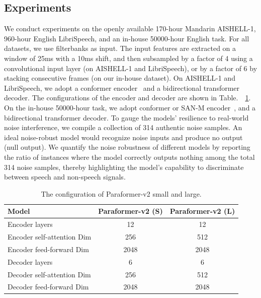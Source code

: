 \documentclass[runningheads]{llncs}
\begin{document}
\subsection{Experiments}
We conduct experiments on the openly available 170-hour Mandarin AISHELL-1, 960-hour English LibriSpeech, and an in-house 50000-hour English task. For all datasets, we use filterbanks as input. The input features are extracted on a window of 25ms with a 10ms shift, and then subsampled by a factor of 4 using a convolutional input layer (on AISHELL-1 and LibriSpeech), or by a factor of 6 by stacking consecutive frames (on our in-house dataset). On AISHELL-1 and LibriSpeech, we adopt a conformer encoder~\cite{conformer} and a bidirectional transformer decoder. The configurations of the encoder and decoder are shown in Table.~~\ref{config}.  On the in-house 50000-hour task, we adopt conformer or SAN-M encoder~\cite{sanm}, and a bidirectional transformer decoder. 
To gauge the models' resilience to real-world noise interference, we compile a collection of 314 authentic noise samples. An ideal noise-robust model would recognize noise inputs and produce no output (null output). We quantify the noise robustness of different models by reporting the ratio of instances where the model correctly outputs nothing among the total 314 noise samples, thereby highlighting the model's capability to discriminate between speech and non-speech signals.
\begin{table}
\caption{The configuration of Paraformer-v2 small and large.}
\label{table}
\centering
\begin{tabular}{l| c| c}
\hline
\textbf{Model} & \textbf{Paraformer-v2 (S)} & \textbf{Paraformer-v2 (L)} \\
\hline
Encoder layers & 12 & 12 \\
Encoder self-attention Dim & 256 & 512 \\
Encoder feed-forward Dim & 2048 & 2048 \\
Decoder layers & 6 & 6 \\
Decoder self-attention Dim & 256 & 512 \\
Decoder feed-forward Dim & 2048 & 2048 \\
\hline
\end{tabular}
\label{config}
\vspace{-0.5cm}
\end{table}
\end{document}
